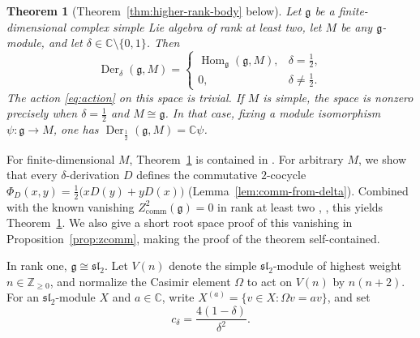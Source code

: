 \documentclass[11pt,reqno]{amsart}
\numberwithin{equation}{section}
\newcommand{\C}{\mathbb C}
\newcommand{\Z}{\mathbb Z}
\newcommand{\g}{\mathfrak g}
\newcommand{\s}{\mathfrak{sl}_2}
\DeclareMathOperator{\Der}{Der}
\DeclareMathOperator{\Hom}{Hom}
\newtheorem{theoremA}{Theorem}
\theoremstyle{definition}
\theoremstyle{remark}
\begin{document}
\begin{theoremA}[Theorem~\ref{thm:higher-rank-body} below]\label{thm:higher-rank}
Let \(\g\) be a finite-dimensional complex simple Lie algebra of
rank at least two, let \(M\) be any \(\g\)-module, and let
\(\delta\in\C\setminus\{0,1\}\). Then
\begin{equation}\label{eq:main-arbitrary}
\Der_\delta(\g,M)=
\begin{cases}
\Hom_\g(\g,M),&\delta=\frac{1}{2},\\[3pt]
0,&\delta\ne\frac{1}{2}.
\end{cases}
\end{equation}
The action \eqref{eq:action} on this space is trivial. If \(M\) is simple,
the space is nonzero precisely when \(\delta=\frac{1}{2}\) and
\(M\cong\g\). In that case, fixing a module isomorphism
\(\psi:\g\to M\), one has \(\Der_{\frac{1}{2}}(\g,M)=\C\psi\).
\end{theoremA}

For finite-dimensional \(M\), Theorem~\ref{thm:higher-rank} is contained in
\cite[Main Theorem]{ZZ21}. For arbitrary \(M\), we show that every
\(\delta\)-derivation \(D\) defines the commutative \(2\)-cocycle
\(\Phi_D(x,y)=\frac{1}{2}\bigl(xD(y)+yD(x)\bigr)\)
(Lemma~\ref{lem:comm-from-delta}). Combined with the known vanishing
\(Z^2_{\mathrm{comm}}(\g)=0\) in rank at least two
\cite[Theorem~1.1]{DB09}, \cite[Corollary~2.5]{DZ10}, this yields
Theorem~\ref{thm:higher-rank}.
We also give a short root space proof of this vanishing in
Proposition~\ref{prop:zcomm}, making the proof of the theorem self-contained.

In rank one, \(\g\cong\s\). Let \(V(n)\) denote the simple
\(\s\)-module of highest weight \(n\in\Z_{\ge0}\), and normalize
the Casimir element \(\Omega\) to act on \(V(n)\) by \(n(n+2)\).
For an \(\s\)-module \(X\) and \(a\in\C\), write
\(X^{(a)}=\{v\in X:\Omega v=av\}\), and set
\[
c_\delta=\frac{4(1-\delta)}{\delta^2}.
\]
\end{document}
